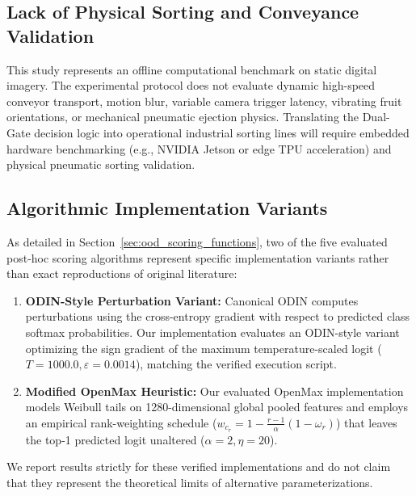 \vspace*{-10pt}\subsection{Lack of Physical Sorting and Conveyance Validation}
\vspace*{-3pt}
\label{sec:limitations_physical_deployment}

This study represents an offline computational benchmark on static digital imagery. The experimental protocol does not evaluate dynamic high-speed conveyor transport, motion blur, variable camera trigger latency, vibrating fruit orientations, or mechanical pneumatic ejection physics. Translating the Dual-Gate decision logic into operational industrial sorting lines will require embedded hardware benchmarking (e.g., NVIDIA Jetson or edge TPU acceleration) and physical pneumatic sorting validation.

\enlargethispage{3\baselineskip}
\vspace*{-10pt}\subsection{Algorithmic Implementation Variants}
\vspace*{-3pt}
\label{sec:limitations_implementation_variants}

As detailed in Section~\ref{sec:ood_scoring_functions}, two of the five evaluated post-hoc scoring algorithms represent specific implementation variants rather than exact reproductions of original literature:
\begin{enumerate}
\setlength{\itemsep}{0pt}
\setlength{\parsep}{0pt}
\setlength{\parskip}{0pt}
\setlength{\topsep}{0pt}
\setlength{\partopsep}{0pt}
\item \textbf{ODIN-Style Perturbation Variant:} Canonical ODIN computes perturbations using the cross-entropy gradient with respect to predicted class softmax probabilities. Our implementation evaluates an ODIN-style variant optimizing the sign gradient of the maximum temperature-scaled logit ($T = 1000.0, \varepsilon = 0.0014$), matching the verified execution script.
\item \textbf{Modified OpenMax Heuristic:} Our evaluated OpenMax implementation models Weibull tails on 1280-dimensional global pooled features and employs an empirical rank-weighting schedule ($w_{c_r} = 1 - \frac{r-1}{\alpha}(1 - \omega_r)$) that leaves the top-1 predicted logit unaltered ($\alpha = 2, \eta = 20$).
\end{enumerate}
We report results strictly for these verified implementations and do not claim that they represent the theoretical limits of alternative parameterizations.

